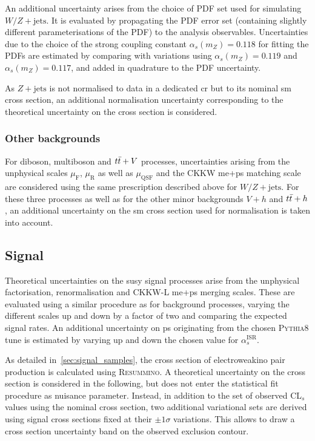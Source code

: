  An additional uncertainty arises from the choice of \gls{PDF} set used for simulating $W/Z+\mathrm{jets}$. It is evaluated by propagating the \gls{PDF} error set (containing slightly different parameterisations of the \gls{PDF}) to the analysis observables. Uncertainties due to the choice of the strong coupling constant $\alpha_s(m_Z) = 0.118$ for fitting the \glspl{PDF} are estimated by comparing with variations using $\alpha_s(m_Z) = 0.119$ and $\alpha_s(m_Z) = 0.117$, and added in quadrature to the \gls{PDF} uncertainty.
 
 As $Z+\mathrm{jets}$ is not normalised to data in a dedicated \gls{cr} but to its nominal \gls{sm} cross section, an additional normalisation uncertainty corresponding to the theoretical uncertainty on the cross section is considered.
  
 \subsubsection{Other backgrounds}
 
 For diboson, multiboson and $t\bar{t}+V$ processes, uncertainties arising from the unphysical scales $\mu_\mathrm{F}$, $\mu_\mathrm{R}$ as well as $\mu_\mathrm{QSF}$ and the CKKW \gls{me}+\gls{ps} matching scale are considered using the same prescription described above for $W/Z+\mathrm{jets}$. For these three processes as well as for the other minor backgrounds $V+h$ and $t\bar{t}+h$, an additional uncertainty on the \gls{sm} cross section used for normalisation is taken into account.
  
 \subsection{Signal}\label{sec:signal_theory_uncertainties}
 
 Theoretical uncertainties on the \gls{susy} signal processes arise from the unphysical factorisation, renormalisation and CKKW-L \gls{me}+\gls{ps} merging scales. These are evaluated using a similar procedure as for background processes, varying the different scales up and down by a factor of two and comparing the expected signal rates. An additional uncertainty on \gls{ps} originating from the chosen \textsc{Pythia8} tune is estimated by varying up and down the chosen value for $\alpha_s^\mathrm{ISR}$.
 
 As detailed in~\cref{sec:signal_samples}, the cross section of electroweakino pair production is calculated using \textsc{Resummino}. A theoretical uncertainty on the cross section is considered in the following, but does not enter the statistical fit procedure as nuisance parameter. Instead, in addition to the set of observed CL$_s$ values using the nominal cross section, two additional variational sets are derived using signal cross sections fixed at their $\pm 1\sigma$ variations. This allows to draw a cross section uncertainty band on the observed exclusion contour. 

